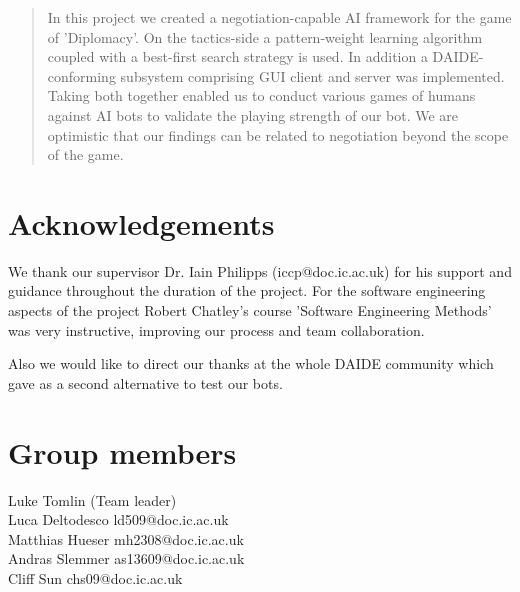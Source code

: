 \documentclass[pdftex,12pt,a4paper]{report}
\begin{document}





\begin{abstract}

In this project we created a negotiation-capable AI framework for the
game of 'Diplomacy'. On the tactics-side a pattern-weight learning
algorithm \cite{Shapiro02} coupled with a best-first search strategy
is used.  In addition a DAIDE-conforming \cite{DaideWeb} subsystem
comprising GUI client and server was implemented. Taking both together
enabled us to conduct various games of humans against AI bots to
validate the playing strength of our bot. We are optimistic that our
findings can be related to negotiation beyond the scope of the game.

\end{abstract}

\setcounter{tocdepth}{2} %

\tableofcontents
\listoffigures
\listoftables
\listofalgorithms



\renewcommand*\thesection{\arabic{section}}

\section{Acknowledgements}

We thank our supervisor Dr. Iain Philipps (iccp@doc.ic.ac.uk) for his
support and guidance throughout the duration of the project. For the
software engineering aspects of the project Robert Chatley's course
'Software Engineering Methods' was very instructive, improving our
process and team collaboration.

Also we would like to direct our thanks at the whole DAIDE community
which gave as a second alternative to test our bots.


\section{Group members} 
Luke Tomlin (Team leader) \\ 
Luca Deltodesco ld509@doc.ic.ac.uk \\ 
Matthias Hueser mh2308@doc.ic.ac.uk \\
Andras Slemmer as13609@doc.ic.ac.uk \\
Cliff Sun chs09@doc.ic.ac.uk \\
\end{document}
